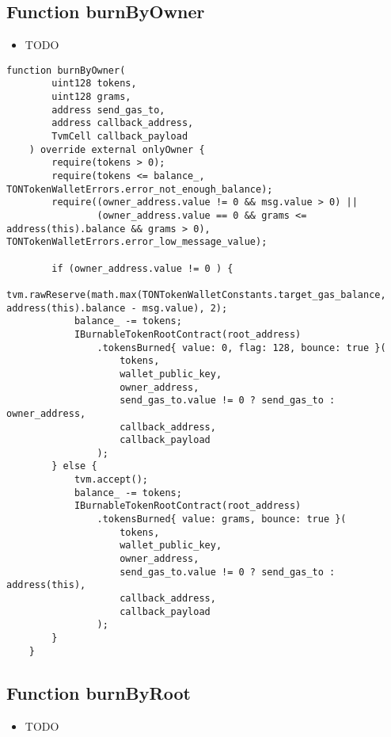 \subsection{Function burnByOwner}

\noindent\begin{itemize}
\item TODO
\end{itemize}

\begin{lstlisting}[firstnumber=473]
    function burnByOwner(
        uint128 tokens,
        uint128 grams,
        address send_gas_to,
        address callback_address,
        TvmCell callback_payload
    ) override external onlyOwner {
        require(tokens > 0);
        require(tokens <= balance_, TONTokenWalletErrors.error_not_enough_balance);
        require((owner_address.value != 0 && msg.value > 0) ||
                (owner_address.value == 0 && grams <= address(this).balance && grams > 0), TONTokenWalletErrors.error_low_message_value);

        if (owner_address.value != 0 ) {
            tvm.rawReserve(math.max(TONTokenWalletConstants.target_gas_balance, address(this).balance - msg.value), 2);
            balance_ -= tokens;
            IBurnableTokenRootContract(root_address)
                .tokensBurned{ value: 0, flag: 128, bounce: true }(
                    tokens,
                    wallet_public_key,
                    owner_address,
                    send_gas_to.value != 0 ? send_gas_to : owner_address,
                    callback_address,
                    callback_payload
                );
        } else {
            tvm.accept();
            balance_ -= tokens;
            IBurnableTokenRootContract(root_address)
                .tokensBurned{ value: grams, bounce: true }(
                    tokens,
                    wallet_public_key,
                    owner_address,
                    send_gas_to.value != 0 ? send_gas_to : address(this),
                    callback_address,
                    callback_payload
                );
        }
    }
\end{lstlisting}

\subsection{Function burnByRoot}

\noindent\begin{itemize}
\item TODO
\end{itemize}

